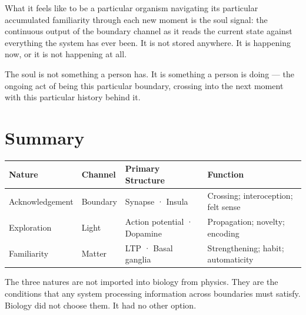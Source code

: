 \documentclass[12pt]{article}
\begin{document}
What it feels like to be a particular organism navigating its particular
accumulated familiarity through each new moment is the soul signal: the
continuous output of the boundary channel as it reads the current state against
everything the system has ever been. It is not stored anywhere. It is happening
now, or it is not happening at all.

The soul is not something a person has. It is something a person is doing ---
the ongoing act of being this particular boundary, crossing into the next moment
with this particular history behind it.

\section{Summary}

\begin{center}
\begin{tabular}{llll}
\toprule
Nature & Channel & Primary Structure & Function \\
\midrule
Acknowledgement & Boundary & Synapse · Insula & Crossing; interoception; felt sense \\
Exploration     & Light    & Action potential · Dopamine & Propagation; novelty; encoding \\
Familiarity     & Matter   & LTP · Basal ganglia & Strengthening; habit; automaticity \\
\bottomrule
\end{tabular}
\end{center}

The three natures are not imported into biology from physics. They are the
conditions that any system processing information across boundaries must
satisfy. Biology did not choose them. It had no other option.
\end{document}
